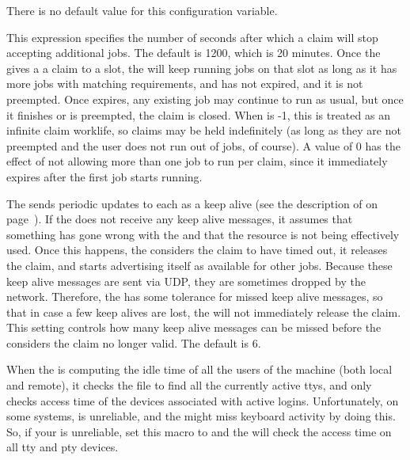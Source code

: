 \begin{description}
  There is no default value for this configuration variable.

\label{param:ClaimWorklife}
\item[\Macro{CLAIM\_WORKLIFE}]
  This expression specifies the number of seconds after which a claim
  will stop accepting additional jobs.  
  The default is 1200, which is 20 minutes.  
  Once the  gives a  a claim to a slot, 
  the  will keep
  running jobs on that slot as long as it has more jobs with matching
  requirements, and  has not expired, and it is
  not preempted.  Once  expires, any existing
  job may continue to run as usual, but once it finishes or is
  preempted, the claim is closed.  When  is -1,
  this is treated as an infinite claim worklife, so claims may be held
  indefinitely (as long as they are not preempted and the user does
  not run out of jobs, of course).  A value of 0 has the effect of not
  allowing more than one job to run per claim, since it immediately
  expires after the first job starts running.

\label{param:MaxClaimAlivesMissed}
\item[\Macro{MAX\_CLAIM\_ALIVES\_MISSED}]
  The  sends periodic updates
  to each  as a keep alive (see the description of
   on page~\pageref{param:AliveInterval}).  
  If the  does not receive any keep alive messages, it assumes
  that something has gone wrong with the  and that the resource
  is not being effectively used.
  Once this happens, the  considers the claim to have timed out,
  it releases the claim, and starts advertising itself as available
  for other jobs.
  Because these keep alive messages are sent via UDP, they are
  sometimes dropped by the network.
  Therefore, the  has some tolerance for missed keep alive
  messages, so that in case a few keep alives are lost, the 
  will not immediately release the claim.
  This setting controls how many keep alive messages can be missed
  before the  considers the claim no longer valid.
  The default is 6.

\label{param:StartdHasBadUtmp}
\item[\Macro{STARTD\_HAS\_BAD\_UTMP}]
  When the  is computing the idle time of all the
  users of the machine (both local and remote), it checks the
   file to find all the currently active ttys, and only
  checks access time of the devices associated with active logins.
  Unfortunately, on some systems,  is unreliable, and the
   might miss keyboard activity by doing this.  So, if your
   is unreliable, set this macro to  and the
   will check the access time on all tty and pty devices.
  

\end{description}
